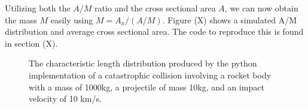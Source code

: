 \documentclass[a4paper, 12pt]{article}
\begin{document}
Utilizing both the $A/M$ ratio and the cross sectional area $A$, we can now obtain the mass $M$ easily using
$M = A_x / (A/M)$.
Figure (X)  shows a simulated A/M distribution and average cross sectional area. The code to reproduce this is found in section (X).
\begin{figure}[H]
	\begin{adjustbox}{max width=1.5\linewidth,center}
		\centering     %
	\end{adjustbox}
	\caption{The characteristic length distribution produced by the python implementation of a catastrophic collision involving a rocket body with a mass of 1000kg, a projectile of mass 10kg, and an impact velocity of 10 km/s. }
\end{figure}
\end{document}
